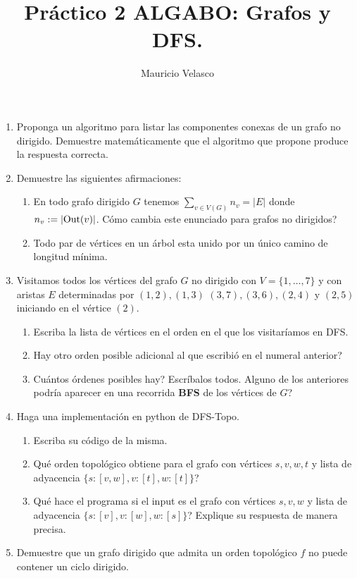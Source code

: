 \documentclass[12pt, a4paper]{article}
\date{}
\begin{document}
\title{Pr\'actico 2 ALGABO: Grafos y DFS.}
\author{Mauricio Velasco}
\maketitle{}
\begin{enumerate} 

\item Proponga un algoritmo para listar las componentes conexas de un grafo no dirigido. Demuestre matem\'aticamente que el algoritmo que propone produce la respuesta correcta.

\item Demuestre las siguientes afirmaciones:
\begin{enumerate}
\item En todo grafo dirigido $G$ tenemos $\sum_{v\in V(G)} n_v=|E|$ donde $n_v:=|{\rm Out}(v)|$. C\'omo cambia este enunciado para grafos no dirigidos?
\item Todo par de v\'ertices en un \'arbol esta unido por un \'unico camino de longitud m\'inima.  
\end{enumerate}

\item Visitamos todos los v\'ertices del grafo $G$ no dirigido con $V=\{1,\dots, 7\}$ y con aristas $E$ determinadas por $(1,2), (1,3)$ $(3,7), (3,6), (2,4)$ y $(2,5)$ iniciando en el v\'ertice $(2)$.
\begin{enumerate}
\item Escriba la lista de v\'ertices en el orden en el que los visitar\'iamos en DFS.
\item Hay otro orden posible adicional al que escribi\'o en el numeral anterior?
\item Cu\'antos \'ordenes posibles hay? Escr\'ibalos todos.
\itam Alguno de los anteriores podr\'ia aparecer en una recorrida {\bf BFS} de los v\'ertices de $G$?
\end{enumerate}

\item Haga una implementaci\'on en python de DFS-Topo.
\begin{enumerate}
\item Escriba su c\'odigo de la misma.
\item Qu\'e orden topol\'ogico obtiene para el grafo con v\'ertices $s,v,w,t$ y lista de adyacencia $\{s:[v,w], v:[t], w:[t]\}$?
\item Qu\'e hace el programa si el input es el grafo con v\'ertices $s,v,w$ y lista de adyacencia $\{s:[v], v:[w], w:[s]\}$? Explique su respuesta de manera precisa.
\end{enumerate}

\item Demuestre que un grafo dirigido que admita un orden topol\'ogico $f$ no puede contener un ciclo dirigido.

\end{enumerate}
\end{document}
